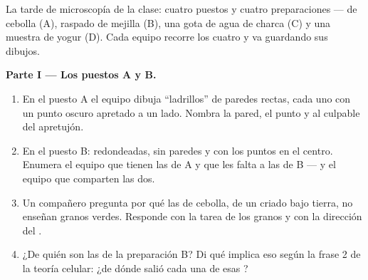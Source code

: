 \begin{problem}\label{pb:g6:cell-unit-of-life:1}
La tarde de microscopía de la clase: cuatro puestos y cuatro
preparaciones ---  de cebolla (A), raspado de mejilla (B), una gota
de agua de charca (C) y una muestra de yogur (D). Cada equipo recorre
los cuatro y va guardando sus dibujos.

\medskip\noindent\textbf{Parte I --- Los puestos A y B.}
\begin{enumerate}
  \item En el puesto A el equipo dibuja ``ladrillos'' de paredes
        rectas, cada uno con un punto oscuro apretado a un lado.
        Nombra la pared, el punto y al culpable del apretujón.
  \item En el puesto B:  redondeadas, sin paredes y con los
        puntos en el centro. Enumera el equipo que tienen las 
        de A y que les falta a las de B --- y el equipo que comparten
        las dos.
  \item Un compañero pregunta por qué las  de cebolla, de un
         criado bajo tierra, no enseñan granos verdes. Responde
        con la tarea de los granos y con la dirección del .
  \item ¿De quién son las  de la preparación B? Di qué implica
        eso según la frase 2 de la teoría celular: ¿de dónde salió cada
        una de esas ?
\end{enumerate}


\end{problem}
